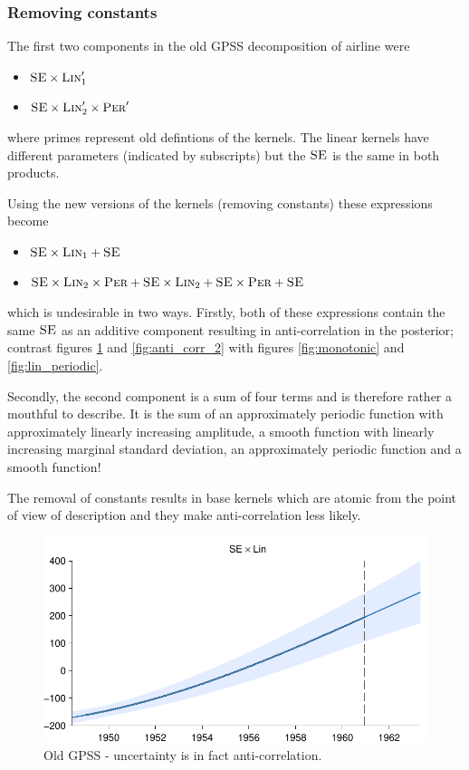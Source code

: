 \documentclass{article}
\begin{document}
\subsubsection{Removing constants}

The first two components in the old GPSS decomposition of airline were
\begin{itemize}
  \item ${\textsc{SE}} \times {\textsc{Lin}}_1'$
  \item ${\textsc{SE}} \times {\textsc{Lin}}_2' \times {\textsc{Per}}'$
\end{itemize}
where primes represent old defintions of the kernels.
The linear kernels have different parameters (indicated by subscripts) but the ${\textsc{SE}}$ is the same in both products.

Using the new versions of the kernels (removing constants) these expressions become
\begin{itemize}
  \item ${\textsc{SE}} \times {\textsc{Lin}}_1 + {\textsc{SE}}$
  \item ${\textsc{SE}} \times {\textsc{Lin}}_2 \times {\textsc{Per}} + {\textsc{SE}} \times {\textsc{Lin}}_2 +  {\textsc{SE}} \times {\textsc{Per}} + {\textsc{SE}}$
\end{itemize}
which is undesirable in two ways.
Firstly, both of these expressions contain the same ${\textsc{SE}}$ as an additive component resulting in anti-correlation in the posterior; contrast figures \ref{fig:anti_corr_1} and \ref{fig:anti_corr_2} with figures \ref{fig:monotonic} and \ref{fig:lin_periodic}.

Secondly, the second component is a sum of four terms and is therefore rather a mouthful to describe.
It is the sum of an approximately periodic function with approximately linearly increasing amplitude, a smooth function with linearly increasing marginal standard deviation, an approximately periodic function and a smooth function!

The removal of constants results in base kernels which are atomic from the point of view of description  and they make anti-correlation less likely.

\begin{figure}[h]
\centering
\includegraphics[width=0.98\columnwidth]{figures/old-gpss/01-airline-months_1}
\caption{Old GPSS - uncertainty is in fact anti-correlation.}
\label{fig:anti_corr_1}
\end{figure}
\end{document}
